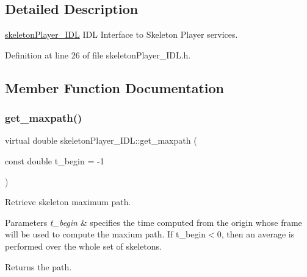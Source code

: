 \subsection{Detailed Description}
\hyperlink{classskeletonPlayer__IDL}{skeleton\+Player\+\_\+\+I\+DL} I\+DL Interface to Skeleton Player services. 

Definition at line 26 of file skeleton\+Player\+\_\+\+I\+D\+L.\+h.



\subsection{Member Function Documentation}
\mbox{\label{classskeletonPlayer__IDL_adf73eb4c86d9d8a19149b29db4284538}} 
\subsubsection{\texorpdfstring{get\+\_\+maxpath()}{get\_maxpath()}}
{\footnotesize\ttfamily virtual double skeleton\+Player\+\_\+\+I\+D\+L\+::get\+\_\+maxpath (\begin{DoxyParamCaption}\item[{const double}]{t\+\_\+begin = {\ttfamily -\/1} }\end{DoxyParamCaption})\hspace{0.3cm}{\ttfamily [virtual]}}


\begin{DoxyItemize}
\item Retrieve skeleton maximum path.
\item 
\begin{DoxyParams}{Parameters}
{\em t\+\_\+begin} & specifies the time computed from the origin whose frame will be used to compute the maxium path. If t\+\_\+begin$<$0, then an average is performed over the whole set of skeletons.\\
\hline
\end{DoxyParams}

\item \begin{DoxyReturn}{Returns}
the path. 
\end{DoxyReturn}

\end{DoxyItemize}\mbox{\label{classskeletonPlayer__IDL_abd0b1247e03f88d2169b0ed943ef91b7}} 
